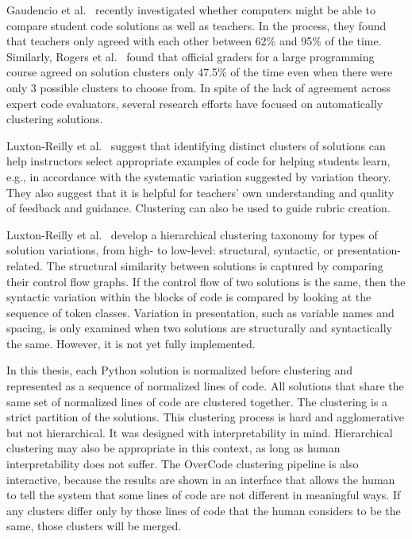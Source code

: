 Gaudencio et al.~\cite{Gaudencio} recently investigated whether computers might be able to compare student code solutions as well as teachers. In the process, they found that teachers only agreed with each other between 62\% and 95\% of the time. Similarly, Rogers et al.~\cite{ACESthesis} found that official graders for a large programming course agreed on solution clusters only 47.5\% of the time even when there were only 3 possible clusters to choose from. In spite of the lack of agreement across expert code evaluators, several research efforts have focused on automatically clustering solutions.

Luxton-Reilly et al.~\cite{Luxton13} suggest that identifying distinct clusters of solutions can help instructors select appropriate examples of code for helping students learn, e.g., in accordance with the systematic variation suggested by variation theory. They also suggest that it is helpful for teachers' own understanding and quality of feedback and guidance. Clustering can also be used to guide rubric creation.

Luxton-Reilly et al.~\cite{Luxton13} develop a hierarchical clustering taxonomy for types of solution variations, from high- to low-level: structural, syntactic, or presentation-related. The structural similarity between solutions is captured by comparing their control flow graphs. If the control flow of two solutions is the same, then the syntactic variation within the blocks of code is compared by looking at the sequence of token classes. Variation in presentation, such as variable names and spacing, is only examined when two solutions are structurally and syntactically the same. However, it is not yet fully implemented. %


In this thesis, each Python solution is normalized before clustering and represented as a sequence of normalized lines of code. All solutions that share the same set of normalized lines of code are clustered together. The clustering is a strict partition of the solutions. This clustering process is hard and agglomerative but not hierarchical. It was designed with interpretability in mind. Hierarchical clustering may also be appropriate in this context, as long as human interpretability does not suffer. The OverCode clustering pipeline is also interactive, because the results are shown in an interface that allows the human to tell the system that some lines of code are not different in meaningful ways. If any clusters differ only by those lines of code that the human considers to be the same, those clusters will be merged.

